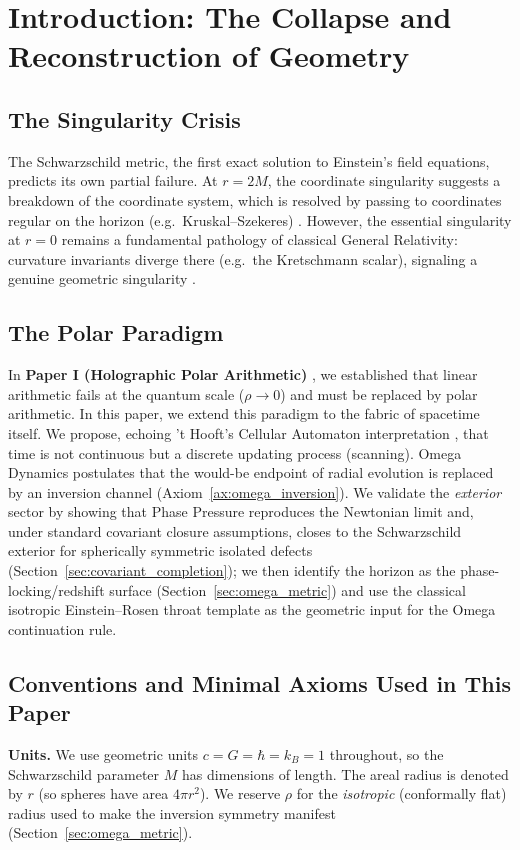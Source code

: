 \section{Introduction: The Collapse and Reconstruction of Geometry}

\subsection{The Singularity Crisis}
The Schwarzschild metric, the first exact solution to Einstein's field equations, predicts its own partial failure. At $r=2M$, the coordinate singularity suggests a breakdown of the coordinate system, which is resolved by passing to coordinates regular on the horizon (e.g.\ Kruskal--Szekeres) \cite{Kruskal1960, Wald1984}. However, the essential singularity at $r=0$ remains a fundamental pathology of classical General Relativity: curvature invariants diverge there (e.g.\ the Kretschmann scalar), signaling a genuine geometric singularity \cite{Penrose1965, MisnerThorneWheeler1973}.

\subsection{The Polar Paradigm}
In \textbf{Paper I (Holographic Polar Arithmetic)} \cite{Ma2025HPA}, we established that linear arithmetic fails at the quantum scale ($\rho \to 0$) and must be replaced by polar arithmetic. In this paper, we extend this paradigm to the fabric of spacetime itself. We propose, echoing 't Hooft's Cellular Automaton interpretation \cite{tHooft2016}, that time is not continuous but a discrete updating process (scanning).
Omega Dynamics postulates that the would-be endpoint of radial evolution is replaced by an inversion channel (Axiom~\ref{ax:omega_inversion}). We validate the \emph{exterior} sector by showing that Phase Pressure reproduces the Newtonian limit and, under standard covariant closure assumptions, closes to the Schwarzschild exterior for spherically symmetric isolated defects (Section~\ref{sec:covariant_completion}); we then identify the horizon as the phase-locking/redshift surface (Section~\ref{sec:omega_metric}) and use the classical isotropic Einstein--Rosen throat template \cite{EinsteinRosen1935, Kruskal1960, Wald1984} as the geometric input for the Omega continuation rule.

\subsection{Conventions and Minimal Axioms Used in This Paper}
\textbf{Units.} We use geometric units $c=G=\hbar=k_B=1$ throughout, so the Schwarzschild parameter $M$ has dimensions of length. The areal radius is denoted by $r$ (so spheres have area $4\pi r^2$). We reserve $\rho$ for the \emph{isotropic} (conformally flat) radius used to make the inversion symmetry manifest (Section~\ref{sec:omega_metric}).

